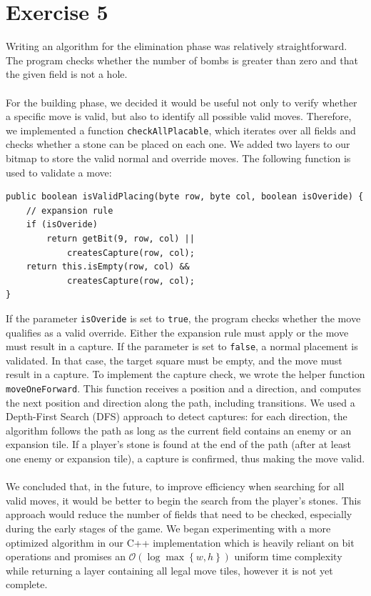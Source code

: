 \section{Exercise 5}

Writing an algorithm for the elimination phase was relatively straightforward. The program checks whether the number of bombs is greater than zero and that the given field is not a hole. \\\\
For the building phase, we decided it would be useful not only to verify whether a specific move is valid, but also to identify all possible valid moves. Therefore, we implemented a function \texttt{checkAllPlacable}, which iterates over all fields and checks whether a stone can be placed on each one. We added two layers to our bitmap to store the valid normal and override moves. The following function is used to validate a move: \\[-0.25em]
\begin{lstlisting}
public boolean isValidPlacing(byte row, byte col, boolean isOveride) {
    // expansion rule
    if (isOveride)
        return getBit(9, row, col) ||
            createsCapture(row, col);
    return this.isEmpty(row, col) &&
            createsCapture(row, col);
}
\end{lstlisting} 
\vspace*{10px}
If the parameter \texttt{isOveride} is set to \texttt{true}, the program checks whether the move qualifies as a valid override. Either the expansion rule must apply or the move must result in a capture. If the parameter is set to \texttt{false}, a normal placement is validated. In that case, the target square must be empty, and the move must result in a capture.
To implement the capture check, we wrote the helper function \texttt{moveOneForward}. This function receives a position and a direction, and computes the next position and direction along the path, including transitions. We used a Depth-First Search (DFS) approach to detect captures: for each direction, the algorithm follows the path as long as the current field contains an enemy or an expansion tile. If a player’s stone is found at the end of the path (after at least one enemy or expansion tile), a capture is confirmed, thus making the move valid. \\ \\
We concluded that, in the future, to improve efficiency when searching for all valid moves, it would be better to begin the search from the player’s stones. This approach would reduce the number of fields that need to be checked, especially during the early stages of the game. We began experimenting with a more optimized algorithm in our C++ implementation which is heavily reliant on bit operations and promises an \(\mathcal{O}\left(\log \max \left\{ w, h \right\}\right)\) uniform time complexity while returning a layer containing all legal move tiles, however it is not yet complete.\\ \\
